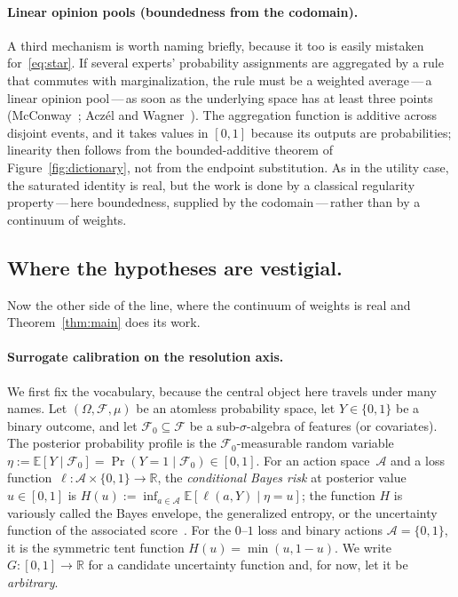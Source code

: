 \documentclass{article}
\theoremstyle{plain}
\theoremstyle{definition}
\newcommand{\R}{\mathbb{R}}
\newcommand{\E}{\mathbb{E}}
\begin{document}
\paragraph{Linear opinion pools (boundedness from the codomain).}
A third mechanism is worth naming briefly, because it too is easily
mistaken for~\eqref{eq:star}. If several experts' probability
assignments are aggregated by a rule that commutes with
marginalization, the rule must be a weighted average\,---\,a linear
opinion pool\,---\,as soon as the underlying space has at least three
points (McConway~\cite{McConway1981}; Acz\'el and
Wagner~\cite{AczelWagner1980}). The aggregation function is additive
across disjoint events, and it takes values in $[0,1]$ because its
outputs are probabilities; linearity then follows from the
bounded-additive theorem of Figure~\ref{fig:dictionary}, not from the
endpoint substitution. As in the utility case, the saturated identity
is real, but the work is done by a classical regularity
property\,---\,here boundedness, supplied by the codomain\,---\,rather
than by a continuum of weights.

\subsection{Where the hypotheses are vestigial.}
\label{ssec:vestigial}

Now the other side of the line, where the continuum of weights is
real and Theorem~\ref{thm:main} does its work.

\paragraph{Surrogate calibration on the resolution axis.}
We first fix the vocabulary, because the central object here travels
under many names. Let $(\Omega,\mathcal{F},\mu)$ be an atomless
probability space, let $Y\in\{0,1\}$ be a binary outcome, and let
$\mathcal{F}_0\subseteq\mathcal{F}$ be a sub-$\sigma$-algebra of features (or covariates).
The posterior probability profile is the $\mathcal{F}_0$-measurable
random variable $\eta:=\E[Y\mid\mathcal{F}_0]=\Pr(Y=1\mid\mathcal{F}_0)\in[0,1]$.
For an action space~$\mathcal{A}$ and a loss function~$\ell\colon\mathcal{A}\times\{0,1\}\to\R$,
the \emph{conditional Bayes risk} at posterior value~$u\in[0,1]$ is
$H(u):=\inf_{a\in\mathcal{A}}\E[\ell(a,Y)\mid \eta=u]$; the function $H$ is
variously called the Bayes envelope, the generalized entropy, or the
uncertainty function of the associated
score~\cite{Savage1971,DeGrootFienberg1983,GrunwaldDawid2004,GneitingRaftery2007,ReidWilliamson2011}.
For the $0$--$1$ loss and binary actions $\mathcal{A}=\{0,1\}$, it is the symmetric tent function $H(u)=\min(u,1-u)$. We write
$G\colon[0,1]\to\R$ for a candidate uncertainty function and, for now,
let it be \emph{arbitrary}.
\end{document}
